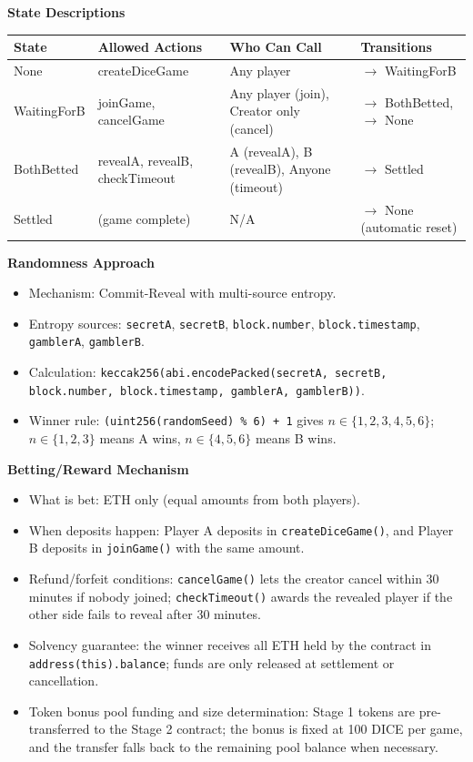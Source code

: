 \documentclass[10pt,a4paper]{article}
\begin{document}
\textbf{State Descriptions}

\begin{tabularx}{\textwidth}{@{}>{\raggedright\arraybackslash}p{}>{\raggedright\arraybackslash}p{}>{\raggedright\arraybackslash}p{}X@{}}
\toprule
\textbf{State} & \textbf{Allowed Actions} & \textbf{Who Can Call} & \textbf{Transitions} \\
\midrule
None & createDiceGame & Any player & $\rightarrow$ WaitingForB \\
WaitingForB & joinGame, cancelGame & Any player (join), Creator only (cancel) & $\rightarrow$ BothBetted, $\rightarrow$ None \\
BothBetted & revealA, revealB, checkTimeout & A (revealA), B (revealB), Anyone (timeout) & $\rightarrow$ Settled \\
Settled & (game complete) & N/A & $\rightarrow$ None (automatic reset) \\
\bottomrule
\end{tabularx}

\medskip
\textbf{Randomness Approach}
\begin{itemize}
  \item Mechanism: Commit-Reveal with multi-source entropy.
  \item Entropy sources: \texttt{secretA}, \texttt{secretB}, \texttt{block.number}, \texttt{block.timestamp}, \texttt{gamblerA}, \texttt{gamblerB}.
  \item Calculation: \texttt{keccak256(abi.encodePacked(secretA, secretB, block.number, block.timestamp, gamblerA, gamblerB))}.
  \item Winner rule: \texttt{(uint256(randomSeed) \% 6) + 1} gives \(n \in \{1,2,3,4,5,6\}\); \(n \in \{1,2,3\}\) means A wins, \(n \in \{4,5,6\}\) means B wins.
\end{itemize}

\textbf{Betting/Reward Mechanism}
\begin{itemize}
  \item What is bet: ETH only (equal amounts from both players).
  \item When deposits happen: Player A deposits in \texttt{createDiceGame()}, and Player B deposits in \texttt{joinGame()} with the same amount.
  \item Refund/forfeit conditions: \texttt{cancelGame()} lets the creator cancel within 30 minutes if nobody joined; \texttt{checkTimeout()} awards the revealed player if the other side fails to reveal after 30 minutes.
  \item Solvency guarantee: the winner receives all ETH held by the contract in \texttt{address(this).balance}; funds are only released at settlement or cancellation.
  \item Token bonus pool funding and size determination: Stage 1 tokens are pre-transferred to the Stage 2 contract; the bonus is fixed at 100 DICE per game, and the transfer falls back to the remaining pool balance when necessary.
\end{itemize}
\end{document}
